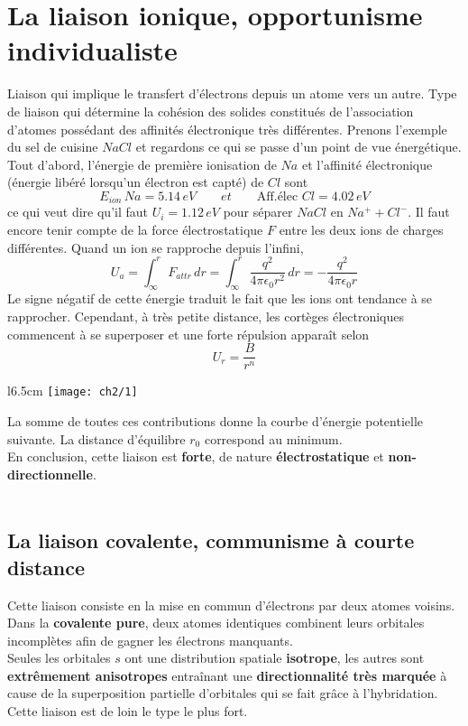 	\section{La liaison ionique, opportunisme individualiste}
		Liaison qui implique le transfert d'électrons depuis un atome vers un autre. Type de liaison qui détermine la cohésion des solides constitués de l'association d'atomes possédant des affinités électronique très différentes. Prenons l'exemple du sel de cuisine $NaCl$ et regardons ce qui se passe d'un point de vue énergétique. Tout d'abord, l'énergie de première ionisation de $Na$ et l'affinité électronique (énergie libéré lorsqu'un électron est capté) de $Cl$ sont
		\begin{equation}
			E_{ion}\, Na= 5.14 \, eV \qquad et \qquad \mbox{Aff.élec } Cl = 4.02 \, eV 
		\end{equation}	 
		ce qui veut dire qu'il faut $U_i = 1.12\, eV$ pour séparer $NaCl$ en $Na^++Cl^-$. Il faut encore tenir compte de la force électrostatique $F$ entre les deux ions de charges différentes. Quand un ion se rapproche depuis l'infini, 
		\begin{equation}
			U_a = \int _\infty ^r F_{attr} \, dr= \int _\infty ^r \frac{q^2}{4\pi \epsilon _0 r^2} \, dr = -\frac{q^2}{4\pi \epsilon _0 r}
		\end{equation}
		Le signe négatif de cette énergie traduit le fait que les ions ont tendance à se rapprocher. Cependant, à très petite distance, les cortèges électroniques commencent à se superposer et une forte répulsion apparaît selon 
		\begin{equation}
			U_r = \frac{B}{r^n}
		\end{equation}
		\begin{wrapfigure}[5]{l}{6.5cm}
		\vspace{-14mm}
		\texttt{[image: ch2/1]}
		\end{wrapfigure}
		La somme de toutes ces contributions donne la courbe d'énergie potentielle suivante. La distance d'équilibre $r_0$ correspond au minimum. \\
	En conclusion, cette liaison est \textbf{forte}, de nature \textbf{électrostatique} et \textbf{non-directionnelle}. \\\\

	\subsection{La liaison covalente, communisme à courte distance}
		Cette liaison consiste en la mise en commun d'électrons par deux atomes voisins. Dans la \textbf{covalente pure}, deux atomes identiques combinent leurs orbitales incomplètes afin de gagner les électrons manquants. \\
		Seules les orbitales $s$ ont une distribution spatiale \textbf{isotrope}, les autres sont \textbf{extrêmement anisotropes} entraînant une \textbf{directionnalité très marquée} à cause de la superposition partielle d'orbitales qui se fait grâce à l'hybridation. Cette liaison est de loin le type le plus fort. 
	
